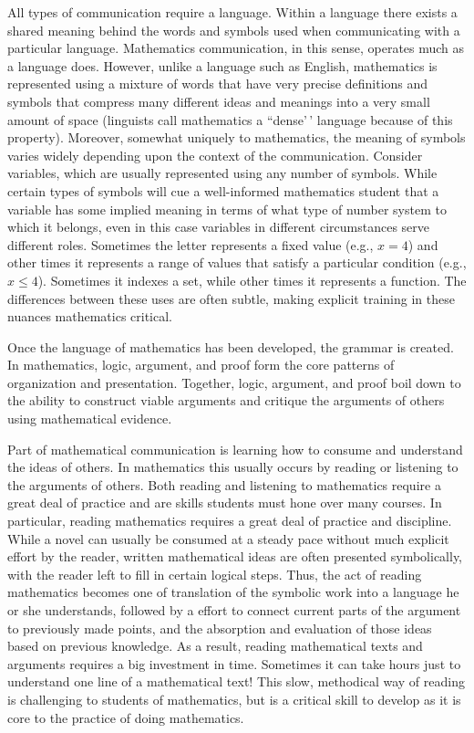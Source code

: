 \documentclass[
]{book}
\theoremstyle{definition}
\theoremstyle{definition}
\theoremstyle{definition}
\theoremstyle{definition}
\theoremstyle{remark}
\begin{document}
All types of communication require a language. Within a language there exists a shared meaning behind the words and symbols used when communicating with a particular language. Mathematics communication, in this sense, operates much as a language does. However, unlike a language such as English, mathematics is represented using a mixture of words that have very precise definitions and symbols that compress many different ideas and meanings into a very small amount of space (linguists call mathematics a ``dense'\,' language because of this property). Moreover, somewhat uniquely to mathematics, the meaning of symbols varies widely depending upon the context of the communication. Consider variables, which are usually represented using any number of symbols. While certain types of symbols will cue a well-informed mathematics student that a variable has some implied meaning in terms of what type of number system to which it belongs, even in this case variables in different circumstances serve different roles. Sometimes the letter represents a fixed value (e.g., \(x=4\)) and other times it represents a range of values that satisfy a particular condition (e.g., \(x\leq 4\)). Sometimes it indexes a set, while other times it represents a function. The differences between these uses are often subtle, making explicit training in these nuances mathematics critical.

Once the language of mathematics has been developed, the grammar is created. In mathematics, logic, argument, and proof form the core patterns of organization and presentation. Together, logic, argument, and proof boil down to the ability to construct viable arguments and critique the arguments of others using mathematical evidence.

Part of mathematical communication is learning how to consume and understand the ideas of others. In mathematics this usually occurs by reading or listening to the arguments of others. Both reading and listening to mathematics require a great deal of practice and are skills students must hone over many courses. In particular, reading mathematics requires a great deal of practice and discipline. While a novel can usually be consumed at a steady pace without much explicit effort by the reader, written mathematical ideas are often presented symbolically, with the reader left to fill in certain logical steps. Thus, the act of reading mathematics becomes one of translation of the symbolic work into a language he or she understands, followed by a effort to connect current parts of the argument to previously made points, and the absorption and evaluation of those ideas based on previous knowledge. As a result, reading mathematical texts and arguments requires a big investment in time. Sometimes it can take hours just to understand one line of a mathematical text! This slow, methodical way of reading is challenging to students of mathematics, but is a critical skill to develop as it is core to the practice of doing mathematics.
\end{document}
